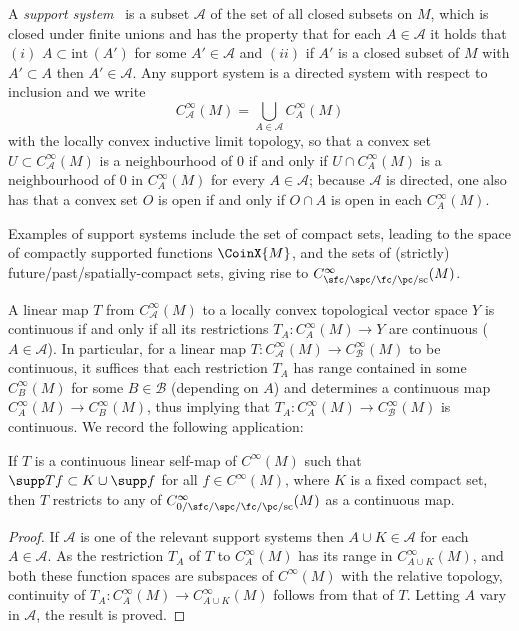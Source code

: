  A \emph{support system}~\cite{Baer:2015} is a subset $\mathscr A$ of the set of all closed subsets on $M$, which is closed under finite unions and has the property that for each $A\in \mathscr A$ it holds that $(i)$
 $A\subset \textrm{int}\,(A')$ for some $A'\in\mathscr A$ and $(ii)$ if $A'$ is a closed subset of $M$ with $A'\subset A$ then $A'\in\mathscr A$. Any support system is a directed system with respect to inclusion and we write
 \begin{equation*}
 	C^\infty_{\mathscr{A}}(M)= \bigcup_{A\in\mathscr{A}} C^\infty_A(M)
 \end{equation*}
 with the locally convex inductive limit topology,
 so that a convex set $U\subset C^\infty_{\mathscr{A}}(M)$ is a neighbourhood of $0$
 if and only if $U\cap C^\infty_A(M)$ is a neighbourhood of $0$ in $C^\infty_A(M)$ for every $A\in\mathscr{A}$; because $\mathscr{A}$ is directed, one also has that
 a convex set $O$ is open if and only if $O\cap A$ is open in each $C^\infty_A(M)$.

 Examples of support systems include the set of compact sets, leading to the space of compactly supported functions $\CoinX{M}$, and the sets of (strictly) future/past/spatially-compact sets, giving rise to $C^\infty_{\sfc/\spc/\fc/\pc/\mathrm{sc}}(M)$.

 A linear map $T$ from $C^\infty_{\mathscr{A}}(M)$ to a locally convex topological vector space $Y$ is continuous if and only if all its restrictions $T_A\colon C^\infty_A(M)\to Y$ are continuous ($A\in\mathscr{A}$). In particular, for a linear map $T\colon C^\infty_{\mathscr{A}}(M)\to C^\infty_{\mathscr{B}}(M)$ to be continuous, it suffices that each restriction $T_A$ has range contained in some $C^\infty_B(M)$ for some $B\in\mathscr{B}$ (depending on $A$) and determines a continuous map $C^\infty_A(M)\to C^\infty_B(M)$, thus implying that $T_A\colon C^\infty_A(M)\to C^\infty_{\mathscr{B}}(M)$ is continuous. We record the following application:
 \begin{Lemma}%
 	If $T$ is a continuous linear self-map of $C^\infty(M)$ such that $\supp Tf\subset K\cup \supp f$ for all $f\in C^\infty(M)$, where $K$ is a fixed compact set, then $T$ restricts to any of $C^\infty_{0/\sfc/\spc/\fc/\pc/\mathrm{sc}}(M)$ as a continuous map.
 \end{Lemma}
 \begin{proof}
 	If $\mathscr{A}$ is one of the relevant support systems then $A\cup K\in\mathscr{A}$ for each $A\in\mathscr{A}$. As the restriction $T_A$ of $T$ to $C^\infty_A(M)$ has its range in $C^\infty_{A\cup K}(M)$, and both these function spaces are subspaces of $C^\infty(M)$ with the relative topology, continuity of $T_A\colon C^\infty_A(M)\to C^\infty_{A\cup K}(M)$ follows from that of $T$. Letting $A$ vary in $\mathscr{A}$, the result is proved.
 \end{proof}

